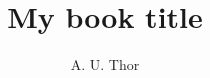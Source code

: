 \author{A. U. Thor}
\title{My book title}
\subtitle{}
\renewcommand{\lsSeries}{cgl}
\renewcommand{\lsSeriesNumber}{}
